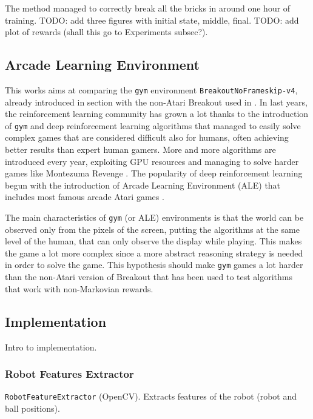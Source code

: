 The method managed to correctly break all the bricks in around one hour of
training. TODO: add three figures with initial state, middle, final.
TODO: add plot of rewards (shall this go to Experiments subsec?).

\subsection{Arcade Learning Environment}
This works aims at comparing the \texttt{gym} environment
\texttt{BreakoutNoFrameskip-v4}, already introduced in section
\label{sec:openaigym} with the non-Atari Breakout used in
\cite{DBLP:journals/corr/abs-1807-06333}. In last years, the reinforcement
learning community has grown a lot thanks to the introduction of \texttt{gym}
and deep reinforcement learning algorithms \cite{mnih2015humanlevel} that
managed to easily solve complex games that are considered difficult also
for humans, often achieving better results than expert human gamers. More
and more algorithms are introduced every year, exploiting GPU resources
and managing to solve harder games like Montezuma Revenge \cite{uber-goexplore}.
The popularity of deep reinforcement learning begun with the introduction of
Arcade Learning Environment (ALE) that includes most
famous arcade Atari games \cite{bellemare13arcade}.

The main characteristics of \texttt{gym} (or ALE) environments is that the
world can be observed only from the pixels of the screen, putting the
algorithms at the same level of the human, that can only observe the display
while playing. This makes the game a lot more complex since a more abstract
reasoning strategy is needed in order to solve the game. This hypothesis should
make \texttt{gym} games a lot harder than the non-Atari version of Breakout
that has been used to test algorithms that work with non-Markovian rewards.

\subsection{Implementation}
Intro to implementation.

\subsubsection{Robot Features Extractor}
\texttt{RobotFeatureExtractor} (OpenCV). Extracts features of the robot (robot
and ball positions).


